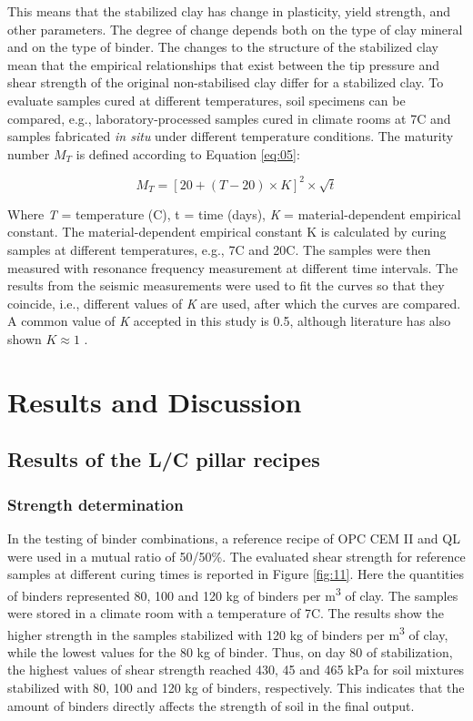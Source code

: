 \documentclass[final,3p,times,onecolumn,authoryear]{elsarticle}
\begin{document}
This means that the stabilized clay has change in plasticity, yield strength, and other parameters. The degree of change depends both on the type of clay mineral and on the type of binder. The changes to the structure of the stabilized clay mean that the empirical relationships that exist between the tip pressure and shear strength of the original non-stabilised clay differ for a stabilized clay. To evaluate samples cured at different temperatures, soil specimens can be compared, e.g., laboratory-processed samples cured in climate rooms at 7\textdegree C and samples fabricated \emph{in situ} under different temperature conditions. The maturity number $M_T$ is defined according to Equation \ref{eq:05}: 

\begin{equation}\label{eq:05}
	M_T =[ 20+(T-20)\times K]^2 \times \sqrt{t}
\end{equation}

Where \emph{T} = temperature (\textdegree C), t = time (days), \emph{K} = material-dependent empirical constant.
The material-dependent empirical constant K is calculated by curing samples at different temperatures, e.g., 7\textdegree C and 20\textdegree C. The samples were then measured with resonance frequency measurement at different time intervals. The results from the seismic measurements were used to fit the curves so that they coincide, i.e., different values of \emph{K} are used, after which the curves are compared. A common value of \emph{K} accepted in this study is 0.5, although literature has also shown $K \approx 1$ \citep{Ahnberg}.

\section{Results and Discussion}
\subsection{Results of the L/C pillar recipes}
\subsubsection{Strength determination}

In the testing of binder combinations, a reference recipe of OPC CEM II and QL were used in a mutual ratio of 50/50\%. The evaluated shear strength for reference samples at different curing times is reported in Figure \ref{fig:11}. Here the quantities of binders represented 80, 100 and 120 kg of binders per m\textsuperscript{3} of clay. The samples were stored in a climate room with a temperature of 7\textdegree C. The results show the higher strength in the samples stabilized with 120 kg of binders per m\textsuperscript{3} of clay, while the lowest values for the 80 kg of binder. Thus, on day 80 of stabilization, the highest values of shear strength reached 430, 45 and 465 kPa for soil mixtures stabilized with 80, 100 and 120 kg of binders, respectively. This indicates that the amount of binders directly affects the strength of soil in the final output. 
\end{document}
